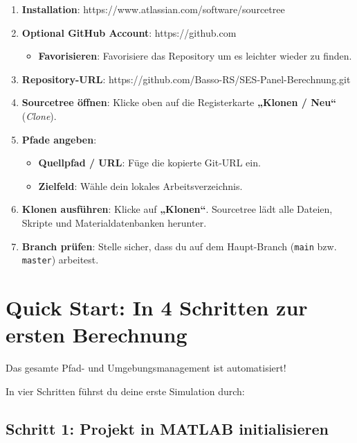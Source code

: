 \begin{enumerate}
    \item \textbf{Installation}: https://www.atlassian.com/software/sourcetree
    \item \textbf{Optional GitHub Account}: https://github.com 
    \begin{itemize}
        \item \textbf{Favorisieren}: Favorisiere das Repository um es leichter wieder zu finden.
    \end{itemize}
    \item \textbf{Repository-URL}: https://github.com/Basso-RS/SES-Panel-Berechnung.git 
    \item \textbf{Sourcetree öffnen}: Klicke oben auf die Registerkarte \textbf{„Klonen / Neu“} (\textit{Clone}).
    \item \textbf{Pfade angeben}:
    \begin{itemize}
        \item \textbf{Quellpfad / URL}: Füge die kopierte Git-URL ein.
        \item \textbf{Zielfeld}: Wähle dein lokales Arbeitsverzeichnis.
    \end{itemize}
    \item \textbf{Klonen ausführen}: Klicke auf \textbf{„Klonen“}. Sourcetree lädt alle Dateien, Skripte und Materialdatenbanken herunter.
    \item \textbf{Branch prüfen}: Stelle sicher, dass du auf dem Haupt-Branch (\texttt{main} bzw. \texttt{master}) arbeitest.
\end{enumerate}
\clearpage









\section{Quick Start: In 4 Schritten zur ersten Berechnung} \label{sec:quickstart}

Das gesamte Pfad- und Umgebungsmanagement ist automatisiert! 
\par In vier Schritten führst du deine erste Simulation durch:





\subsection*{Schritt 1: Projekt in MATLAB initialisieren}

